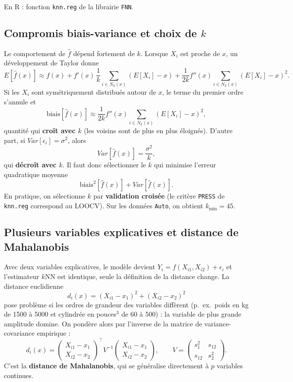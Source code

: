 \documentclass[
  french,
  letterpaper,
  DIV=11,
  numbers=noendperiod]{scrreprt}
\begin{document}
En R : fonction \texttt{knn.reg} de la librairie \texttt{FNN}.

\subsection{\texorpdfstring{Compromis biais-variance et choix de
\(k\)}{Compromis biais-variance et choix de k}}\label{compromis-biais-variance-et-choix-de-k}

Le comportement de \(\hat f\) dépend fortement de \(k\). Lorsque \(X_i\)
est proche de \(x\), un développement de Taylor donne
\[E[\hat f(x)] \approx f(x) + f'(x)\,\frac{1}{k}\sum_{i\in N_k(x)}(E[X_i] - x) + \frac{1}{2k}f''(x)\sum_{i\in N_k(x)}(E[X_i] - x)^2.\]
Si les \(X_i\) sont symétriquement distribués autour de \(x\), le terme
du premier ordre s'annule et
\[\mbox{biais}[\hat f(x)] \approx \frac{1}{2k}f''(x)\sum_{i\in N_k(x)}(E[X_i] - x)^2,\]
quantité qui \textbf{croît avec \(k\)} (les voisins sont de plus en plus
éloignés). D'autre part, si \(Var[\epsilon_i] = \sigma^2\), alors
\[Var[\hat f(x)] = \frac{\sigma^2}{k},\] qui \textbf{décroît avec
\(k\)}. Il faut donc sélectionner le \(k\) qui minimise l'erreur
quadratique moyenne \[\mbox{biais}^2[\hat f(x)] + Var[\hat f(x)].\] En
pratique, on sélectionne \(k\) par \textbf{validation croisée} (le
critère \texttt{PRESS} de \texttt{knn.reg} correspond au LOOCV). Sur les
données \texttt{Auto}, on obtient \(k_{\min} = 45\).

\subsection{Plusieurs variables explicatives et distance de
Mahalanobis}\label{plusieurs-variables-explicatives-et-distance-de-mahalanobis}

Avec deux variables explicatives, le modèle devient
\(Y_i = f(X_{i1}, X_{i2}) + \epsilon_i\) et l'estimateur \(k\)NN est
identique, seule la définition de la distance change. La distance
euclidienne \[d_i(x) = (X_{i1} - x_1)^2 + (X_{i2} - x_2)^2\] pose
problème si les ordres de grandeur des variables diffèrent (p.~ex.~poids
en kg de 1500 à 5000 et cylindrée en pouces\(^3\) de 60 à 500) : la
variable de plus grande amplitude domine. On pondère alors par l'inverse
de la matrice de variance-covariance empirique :
\[d_i(x) = \begin{pmatrix} X_{i1}-x_1 \\ X_{i2}-x_2\end{pmatrix}^{\!\top} V^{-1}\begin{pmatrix} X_{i1}-x_1 \\ X_{i2}-x_2\end{pmatrix},
\qquad V = \begin{pmatrix} s_1^2 & s_{12} \\ s_{12} & s_2^2\end{pmatrix}.\]
C'est la \textbf{distance de Mahalanobis}, qui se généralise directement
à \(p\) variables continues.
\end{document}
